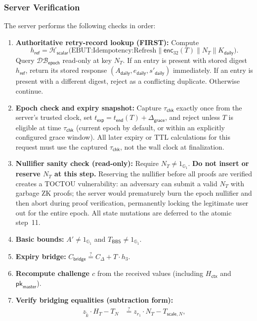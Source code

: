 \documentclass[11pt]{article}
\theoremstyle{definitionstyle}
\theoremstyle{plain}
\newcommand{\DB}{\mathcal{DB}}
\begin{document}
\subsubsection{Server Verification}
The server performs the following checks in order:
\begin{enumerate}[leftmargin=*]
\item \textbf{Authoritative retry-record lookup (FIRST):} Compute
  \[
  h_{\mathsf{ref}} = \mathcal{H}_{\mathsf{scalar}}\!\bigl(\text{EBUT:Idempotency:Refresh} \parallel \mathsf{enc}_{32}(T) \parallel N_T \parallel K_{\mathsf{daily}}\bigr).
  \]
  Query $\DB_{\mathsf{epoch}}$ read-only at key $N_T$. If an entry is present with stored digest $h_{\mathsf{ref}}$, return its stored response $(A_{\mathsf{daily}}, e_{\mathsf{daily}}, s'_{\mathsf{daily}})$ immediately. If an entry is present with a different digest, reject as a conflicting duplicate. Otherwise continue.
\item \textbf{Epoch check and expiry snapshot:} Capture $\tau_{\mathsf{chk}}$ exactly once from the server's trusted clock, set $t_{\mathsf{exp}} = t_{\mathsf{end}}(T)+\Delta_{\mathsf{grace}}$, and reject unless $T$ is eligible at time $\tau_{\mathsf{chk}}$ (current epoch by default, or within an explicitly configured grace window). All later expiry or TTL calculations for this request must use the captured $\tau_{\mathsf{chk}}$, not the wall clock at finalization.
\item \textbf{Nullifier sanity check (read-only):} Require $N_T \neq 1_{\mathbb{G}_1}$. \textbf{Do not insert or reserve $N_T$ at this step.} Reserving the nullifier before all proofs are verified creates a TOCTOU vulnerability: an adversary can submit a valid $N_T$ with garbage ZK proofs; the server would prematurely burn the epoch nullifier and then abort during proof verification, permanently locking the legitimate user out for the entire epoch. All state mutations are deferred to the atomic step~11.
\item \textbf{Basic bounds:} $A' \neq 1_{\mathbb{G}_1}$ and $T_{\mathsf{BBS}} \neq 1_{\mathbb{G}_1}$.
\item \textbf{Expiry bridge:} $C_{\mathsf{bridge}} \stackrel{?}{=} C_{\Delta} + T \cdot h_3$.
\item \textbf{Recompute challenge $c$} from the received values (including $H_{\mathsf{ctx}}$ and $\mathsf{pk}_{\mathsf{master}}$).
\item \textbf{Verify bridging equalities (subtraction form):}
  \begin{align*}
    z_{\tilde{k}} \cdot H_T - T_N &\stackrel{?}{=} z_{r_1} \cdot N_T - T_{\mathsf{scale},N}, \\

\end{align*}
\end{enumerate}
\end{document}
